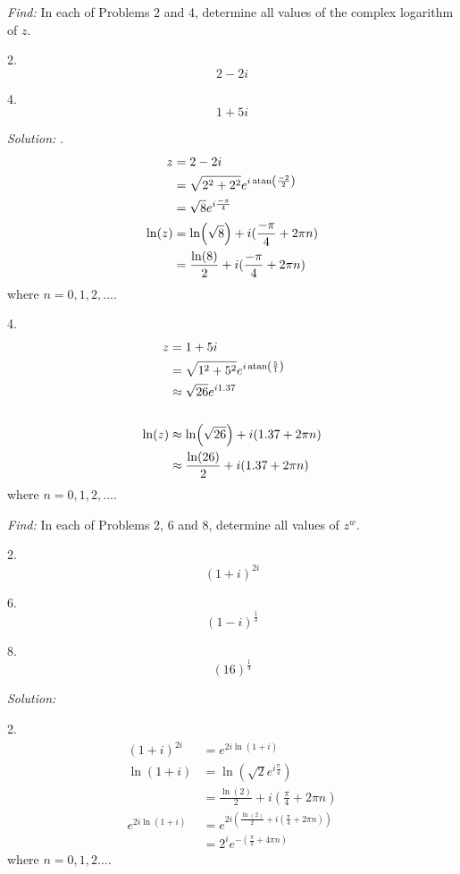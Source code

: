 \documentclass[11pt]{homework}
\begin{document}
\newpage
{}
\emph{Find:}
In each of Problems 2 and 4,
determine all values of the 
complex logarithm of $z$.

2. 
\begin{equation*}
  2 - 2i
\end{equation*}

4. 
\begin{equation*}
  1 + 5i
\end{equation*}

\emph{Solution:}
.
\begin{align*}
  z&= 2-2i  \\
   &= \sqrt{2^2 + 2^2} e^{i \atan(\frac{-2}{2})} \\
   &= \sqrt{8} e^{i \frac{-\pi}{4}}
  \\
 \ln(z) &= \ln(\sqrt{8}) + i (\frac{-\pi}{4} + 2\pi n) \\
    &= \frac{\ln(8)}{2} + i (\frac{-\pi}{4} + 2\pi n) 
\end{align*}
where $n=0,1,2,...$.

4.
\begin{align*}
  z&= 1+5i \\
   &= \sqrt{1^2 + 5^2} e^{i\atan(\frac{5}{1})} \\
   &\approx \sqrt{26} e^{i 1.37} \\
  \\
\ln(z) &\approx \ln( \sqrt{26}) + i( 1.37 +2\pi n) \\
       &\approx \frac{\ln( 26)}{2} + i( 1.37 +2\pi n)
\end{align*}
where $n=0,1,2,...$.


\newpage
{}
\emph{Find:}
In each of Problems 2, 6 and 8,
determine all values of $z^w$.

2.
\begin{equation*}
  (1+i)^{2i}
\end{equation*}

6.
\begin{equation*}
  (1-i)^{\frac{1}{3}}
\end{equation*}

8.
\begin{equation*}
  (16)^{\frac{1}{4}}
\end{equation*}

\emph{Solution:}
\newline

2.
\begin{align*}
(1+i)^{2i} &= e^{2i \ln(1+i)} \\
\ln(1+i) &= \ln(\sqrt{2} e^{i \frac{\pi}{4}}) \\ 
  &= \frac{\ln(2)}{2} + i( \frac{\pi}{4} + 2\pi n) \\
e^{2i \ln(1+i)} 
  &= e^{2i
        \left(
          \frac{\ln(2)}{2} + i( \frac{\pi}{4} + 2\pi n)
        \right)} \\
  &= 2^i e^{- 
        \left(
           \frac{\pi}{2} + 4\pi n
        \right)}
\end{align*}
where $n=0,1,2...$.
\end{document}
